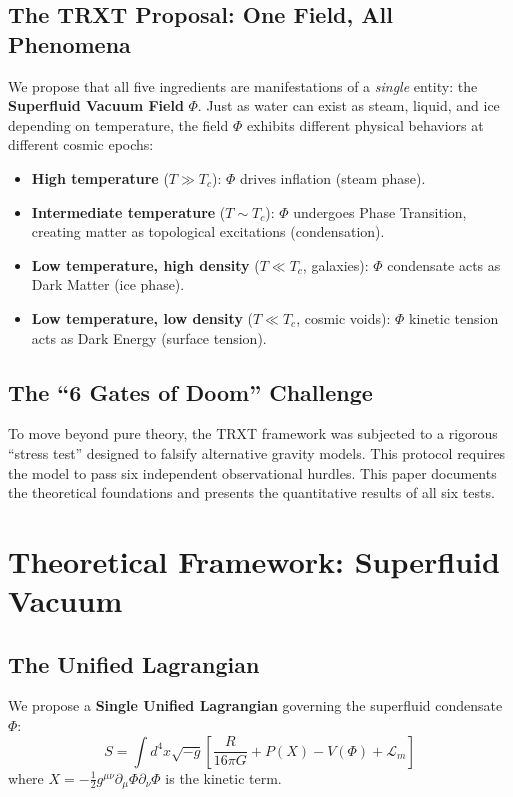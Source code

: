 \documentclass[a4paper,12pt]{article}
\begin{document}
\subsection{The TRXT Proposal: One Field, All Phenomena}
We propose that all five ingredients are manifestations of a \textit{single} entity: the \textbf{Superfluid Vacuum Field} $\Phi$. Just as water can exist as steam, liquid, and ice depending on temperature, the field $\Phi$ exhibits different physical behaviors at different cosmic epochs:

\begin{itemize}
    \item \textbf{High temperature} ($T \gg T_c$): $\Phi$ drives inflation (steam phase).
    \item \textbf{Intermediate temperature} ($T \sim T_c$): $\Phi$ undergoes Phase Transition, creating matter as topological excitations (condensation).
    \item \textbf{Low temperature, high density} ($T \ll T_c$, galaxies): $\Phi$ condensate acts as Dark Matter (ice phase).
    \item \textbf{Low temperature, low density} ($T \ll T_c$, cosmic voids): $\Phi$ kinetic tension acts as Dark Energy (surface tension).
\end{itemize}

\subsection{The ``6 Gates of Doom'' Challenge}
To move beyond pure theory, the TRXT framework was subjected to a rigorous ``stress test'' designed to falsify alternative gravity models. This protocol requires the model to pass six independent observational hurdles. This paper documents the theoretical foundations and presents the quantitative results of all six tests.

\section{Theoretical Framework: Superfluid Vacuum}

\subsection{The Unified Lagrangian}
We propose a \textbf{Single Unified Lagrangian} governing the superfluid condensate $\Phi$:
\begin{equation}
    S = \int d^4x \sqrt{-g} \left[ \frac{R}{16\pi G} + P(X) - V(\Phi) + \mathcal{L}_m \right]
\end{equation}
where $X = - \frac{1}{2} g^{\mu\nu} \partial_\mu \Phi \partial_\nu \Phi$ is the kinetic term.
\end{document}
